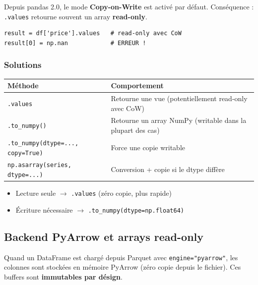 \documentclass[11pt, a4paper]{article}
\begin{document}
Depuis pandas 2.0, le mode \textbf{Copy-on-Write} est activ\'e par d\'efaut.
Cons\'equence : \texttt{.values} retourne souvent un array \textbf{read-only}.

\begin{warnbox}
\begin{lstlisting}
result = df['price'].values   # read-only avec CoW
result[0] = np.nan            # ERREUR !
\end{lstlisting}
\end{warnbox}

\subsubsection{Solutions}

\begin{center}
\begin{tabular}{lp{7cm}}
\toprule
\textbf{M\'ethode} & \textbf{Comportement} \\
\midrule
\texttt{.values} & Retourne une vue (potentiellement read-only avec CoW) \\
\texttt{.to\_numpy()} & Retourne un array NumPy (writable dans la plupart des cas) \\
\texttt{.to\_numpy(dtype=..., copy=True)} & Force une copie writable \\
\texttt{np.asarray(series, dtype=...)} & Conversion + copie si le dtype diff\`ere \\
\bottomrule
\end{tabular}
\end{center}

\begin{tipbox}
\begin{itemize}
    \item Lecture seule $\rightarrow$ \texttt{.values} (z\'ero copie, plus rapide)
    \item \'Ecriture n\'ecessaire $\rightarrow$ \texttt{.to\_numpy(dtype=np.float64)}
\end{itemize}
\end{tipbox}

\subsection{Backend PyArrow et arrays read-only}

Quand un DataFrame est charg\'e depuis Parquet avec \texttt{engine="pyarrow"},
les colonnes sont stock\'ees en m\'emoire PyArrow (z\'ero copie depuis le fichier).
Ces buffers sont \textbf{immutables par d\'esign}.
\end{document}
